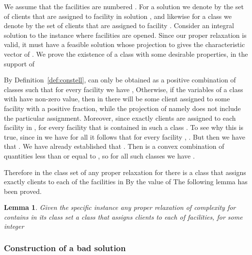 \documentclass[11pt]{article}
\newtheorem{lemma}{Lemma}[section]
\begin{document}
 We  assume that  the  facilities are  numbered
. 
For a solution  we  denote by 
the set  of clients  that are assigned  to facility   in solution
, and  likewise for a  class  we denote  by 
the set of clients that are assigned to facility .  
Consider  an  integral  solution    to  the  instance  where 
facilities   are opened. 
Since our proper  relaxation is valid, it must have   a feasible 
solution   whose projection to  gives the characteristic
vector of .  We prove the existence of a  class  with some desirable
properties, in the support of  

By Definition~\ref{def:constell},
 can only be obtained as a positive combination of classes  such that for
every    facility       we   have    , Otherwise,  if the variables  of a  class 
with  have  non-zero value,
then in  there will be  some client assigned to
some facility with a positive fraction, while the projection of  namely 
does  not include  the
particular  assignment.  
Moreover,  since exactly  clients are  assigned to each
facility in  ,   for every facility 
that   is  contained   in  such   a  class     . To see why this  is true, 
since in   we have  for all    it follows  that for every facility ,
 .  
But  then  we have  that
.  We have already established   that . Then  is  a convex combination
of quantities less than or equal to , so for all such classes 
we have .


Therefore
in the class set of any proper relaxation for  there is 
a class  that assigns exactly  clients to each of  the
facilities in  By the value of  
  The following
lemma has been proved. 


\iffalse     --- old version 
\begin{lemma}
There is a class  that is contained in the class set of the proper
relaxation, that assigns  clients to each of  for some facilities.
\end{lemma}
\fi 
\begin{lemma}   \label{lemma:existence} 
Given the specific instance  any proper relaxation  of complexity
 for  contains in its class set a class 
 that assigns  clients to each of  facilities, for some
integer   
\end{lemma}





\subsubsection{Construction of a bad  solution}  
\label{subsec:badlbfl}
\end{document}
